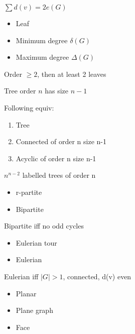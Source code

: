 \begin{lemma}
    $\sum d(v) = 2e(G)$
\end{lemma}

\begin{itemize}
    \item Leaf
    \item Minimum degree $\delta(G)$
    \item Maximum degree $\Delta(G)$
\end{itemize}

\begin{thm}
    Order $\geq 2$, then at least 2 leaves
\end{thm}

\begin{cor}
    Tree order $n$ has size $n-1$
\end{cor}

\begin{cor}
    Following equiv:
    \begin{enumerate}
        \item Tree
        \item Connected of order n size n-1
        \item Acyclic of order n size n-1
    \end{enumerate}
\end{cor}

\begin{thm} [Caley]
    $n^{n-2}$ labelled trees of order n
\end{thm}

\begin{itemize}
    \item r-partite
    \item Bipartite
\end{itemize}

\begin{thm}
    Bipartite iff no odd cycles
\end{thm}

\begin{itemize}
    \item Eulerian tour
    \item Eulerian
\end{itemize}

\begin{thm}
    Eulerian iff $|G| > 1$, connected, d(v) even
\end{thm}

\begin{itemize}
   \item Planar
   \item Plane graph
   \item Face
\end{itemize}

